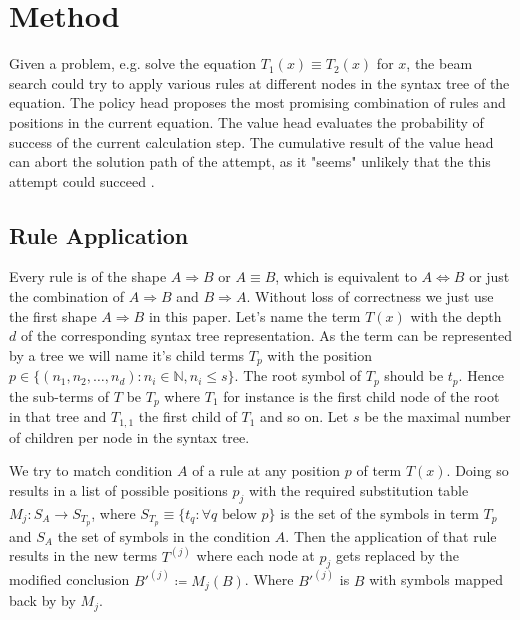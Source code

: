 \documentclass{scrartcl}
\theoremstyle{definition}
\begin{document}
\section{Method}

Given a problem, e.g. solve the equation $T_1\left(x\right)\equiv T_2\left(x\right)$ for $x$,
the beam search could try to apply various rules at different nodes in the syntax tree of the equation.
The policy head proposes the most promising combination of rules and positions in the current equation.
The value head evaluates the probability of success of the current calculation step.
The cumulative result of the value head can abort the solution path of the attempt, as it "seems" unlikely that the this attempt could succeed \cite{44806}.

\subsection{Rule Application}

Every rule is of the shape $A \Longrightarrow B$ or $A \equiv B$, which is equivalent to $A \Longleftrightarrow B$ or just the combination of $A \Longrightarrow B$ and $B \Longrightarrow A$.
Without loss of correctness we just use the first shape $A \Longrightarrow B$ in this paper.
Let's name the term $T\left(x\right)$ with the depth $d$ of the corresponding syntax tree representation.
As the term can be represented by a tree we will name it's child terms $T_p$ with the position $p \in \big\{\left( n_1, n_2, \dots, n_d \right) : n_i \in \mathbb{N}, n_i \leq s \big\}$.
The root symbol of $T_p$ should be $t_p$.
Hence the sub-terms of $T$ be $T_p$ where $T_1$ for instance is the first child node of the root in that tree and $T_{1,1}$ the first child of $T_1$ and so on.
Let $s$ be the maximal number of children per node in the syntax tree.

We try to match condition $A$ of a rule at any position $p$ of term $T\left(x\right)$.
Doing so results in a list of possible positions $p_j$ with the required substitution table $M_j: S_A \to S_{T_p}$,
where $S_{T_p} \equiv \big\{ t_q : \forall q \text{ below } p\big\}$ is the set of the symbols in term $T_p$ and $S_A$ the set of symbols in the condition $A$.
Then the application of that rule results in the new terms $T^{(j)}$ where each node at $p_j$ gets replaced by the modified conclusion $B'^{(j)} \coloneqq M_j\left( B \right)$.
Where $B'^{(j)}$ is $B$ with symbols mapped back by by $M_j$. 
\end{document}
